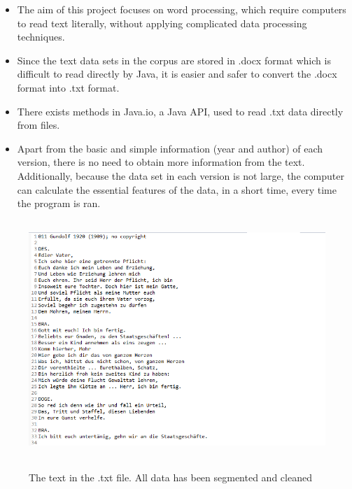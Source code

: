 \begin{itemize}
	\item \textbf{} The aim of this project focuses on word processing, which require computers to read text literally, without applying complicated data processing techniques.
	\item \textbf{} Since the text data sets in the corpus are stored in .docx format which is difficult to read directly by Java, it is easier and safer to convert the .docx format into .txt format.
	\item \textbf{} There exists methods in Java.io, a Java API, used to read .txt data directly from files.
	\item \textbf{} Apart from the basic and simple information (year and author) of each version, there is no need to obtain more information from the text. Additionally, because the data set in each version is not large, the computer can calculate the essential features of the data, in a short time, every time the program is ran. 
\end{itemize}
\begin{figure}[h]
	\centering	
	\includegraphics[width=13cm, height=9cm]{Figs/Data-example}\\[1ex]
	\caption{The text in the .txt file. All data has been segmented and cleaned}
	\label{fig:dataExample}
\end{figure}




